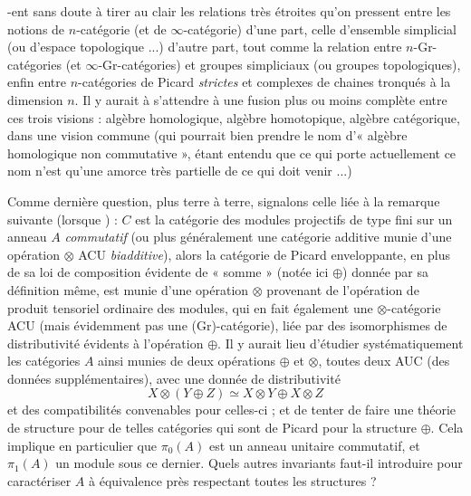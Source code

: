\documentclass[11pt,a4paper]{article}
\begin{document}
-ent sans doute à tirer au clair les relations très étroites qu'on
pressent entre les notions de $n$-catégorie (et de $\infty$-catégorie)
d'une part, celle d'ensemble simplicial (ou d'espace topologique ...)
d'autre part, tout comme la relation entre $n$-Gr-catégories (et
$\infty$-Gr-catégories) et groupes simpliciaux (ou groupes topologiques),
enfin entre \struck{\ill} $n$-catégories de Picard \emph{strictes} et
\struck{\ill} complexes de chaines tronqués à la dimension $n$. Il y
aurait à s'attendre à une fusion plus ou moins complète entre ces trois
visions : algèbre homologique, algèbre homotopique, algèbre catégorique,
dans une vision commune (qui pourrait bien prendre le nom d'« algèbre
homologique non commutative », étant entendu que ce qui porte actuellement
ce nom n'est qu'une amorce très partielle de ce qui doit venir ...)

Comme dernière question, plus terre à terre, signalons celle liée à la
remarque  suivante (lorsque \struck{\ill}) : $C$ est la
catégorie des modules projectifs de type fini sur un anneau $A$
\emph{commutatif} (ou plus généralement une catégorie additive munie d'une
opération $\otimes$ ACU \emph{biadditive}), alors la catégorie de Picard
enveloppante, en plus de sa loi de composition évidente de « somme »
(notée ici $\oplus$) donnée par sa définition même, est munie d'une
opération $\otimes$ provenant de l'opération de produit tensoriel
ordinaire des modules, qui en fait également une $\otimes$-catégorie ACU
(mais évidemment pas une (Gr)-catégorie), liée par des isomorphismes de
distributivité évidents à l'opération $\oplus$.  Il y aurait lieu d'étudier systématiquement les catégories
$A$ ainsi munies de deux opérations $\oplus$ et $\otimes$, toutes deux AUC
(des données supplémentaires), avec une donnée de distributivité
\[
X \otimes (Y \oplus Z) \simeq X \otimes Y \oplus X \otimes Z
\]
et des compatibilités convenables pour celles-ci ; et de tenter de faire
une théorie de structure pour de telles catégories qui sont de
\struck{\ill} Picard pour la structure $\oplus$. Cela implique en
particulier que $\pi_{0}(A)$ est un anneau unitaire commutatif, et
$\pi_{1}(A)$ un module sous ce dernier. Quels autres invariants faut-il
introduire pour caractériser $A$ à équivalence près respectant toutes les
structures ?
\end{document}
